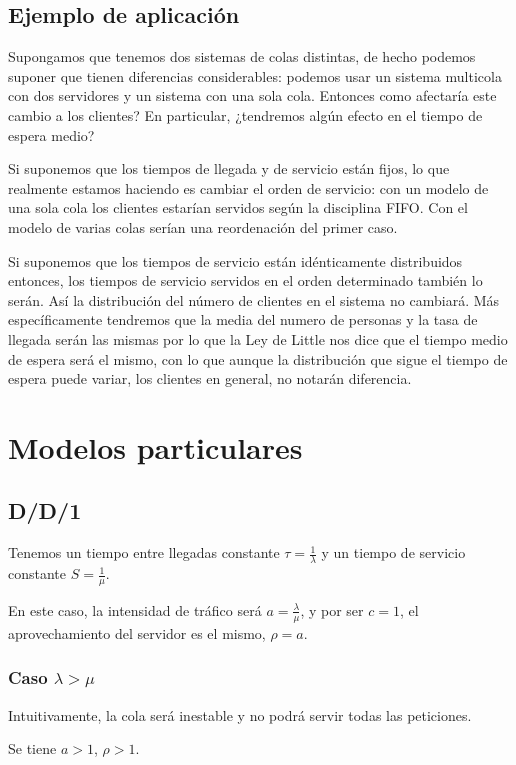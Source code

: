 \documentclass[a4paper,10pt]{scrartcl}
\theoremstyle{definition}
\numberwithin{equation}{section}
\begin{document}
	\subsection{Ejemplo de aplicación}
	Supongamos que tenemos dos sistemas de colas distintas, de hecho podemos suponer que tienen diferencias considerables: podemos usar un sistema multicola con dos servidores y un sistema con una sola cola. Entonces como afectaría este cambio a los clientes? En particular, ¿tendremos algún efecto en el tiempo de espera medio?
	
	Si suponemos que los tiempos de llegada y de servicio están fijos, lo que realmente estamos haciendo es cambiar el orden de servicio: con un modelo de una sola cola los clientes estarían servidos según la disciplina FIFO. Con el modelo de varias colas serían una reordenación del primer caso.
	
	Si suponemos que los tiempos de servicio están idénticamente distribuidos entonces, los tiempos de servicio servidos en el orden determinado también lo serán. Así la distribución del número de clientes en el sistema no cambiará. Más específicamente tendremos que la media del numero de personas y la tasa de llegada serán las mismas por lo que la Ley de Little nos dice que el tiempo medio de espera será el mismo, con lo que aunque la distribución que sigue el tiempo de espera puede variar, los clientes en general, no notarán diferencia.
	
	\section{Modelos particulares}
	\subsection{D/D/1}
	Tenemos un tiempo entre llegadas constante $\tau = \frac{1}{\lambda}$ y un tiempo de servicio constante $S = \frac{1}{\mu}$.
	
	En este caso, la intensidad de tráfico será $a=\frac{\lambda}{\mu}$, y por ser $c = 1$, el aprovechamiento del servidor es el mismo, $\rho = a$.
	
	\subsubsection{Caso $\lambda > \mu$}
	Intuitivamente, la cola será inestable y no podrá servir todas las peticiones. 
	
	Se tiene $a > 1$, $\rho > 1$.
	
\end{document}
